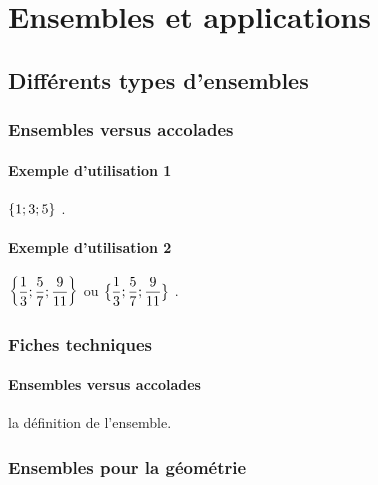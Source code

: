 \documentclass[12pt,a4paper]{article}
\begin{document}
\section{Ensembles et applications}

\subsection{Différents types d'ensembles}

\subsubsection{Ensembles versus accolades}

\paragraph{Exemple d'utilisation 1}

\begin{latexex}
$\setgene{1 ; 3 ; 5}$ .
\end{latexex}




\paragraph{Exemple d'utilisation 2}

\begin{latexex}
$\displaystyle
 \setgene{\frac{1}{3} ; \frac{5}{7} ; 
          \frac{9}{11}}$
ou
$\displaystyle
 \setgene*{\frac{1}{3} ; \frac{5}{7} ;
           \frac{9}{11}}$ .
\end{latexex}




\subsubsection{Fiches techniques}

\paragraph{Ensembles versus accolades}



\IDarg{} la définition de l'ensemble.




\subsubsection{Ensembles pour la géométrie} \label{set-geo}
\end{document}
